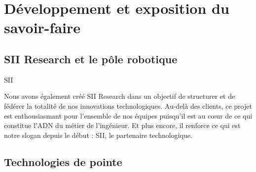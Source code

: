 {	\section{Développement et exposition du savoir-faire}
	
		\subsection{SII Research et le pôle robotique}
			
			\par
			{
				SII
			}
			\par
			{
				Nous avons également créé SII Research dans un objectif de structurer et de fédérer la totalité de nos innovations technologiques. Au-delà des clients, ce projet est enthousiasmant pour l’ensemble de nos équipes puisqu’il est au cœur de ce qui constitue l’ADN du métier de l’ingénieur. Et plus encore, il renforce ce qui est notre slogan depuis le début : SII, le partenaire technologique.
			}
			\par
			
		\subsection{Technologies de pointe}
		
			\lipsum[10-12]
			
}
